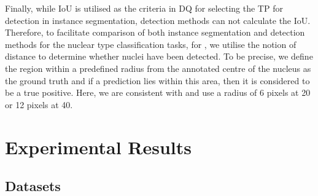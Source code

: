 \documentclass[journal]{IEEEtran}
\begin{document}
    Finally, while IoU is utilised as the criteria in DQ for selecting the TP for detection in instance segmentation, detection methods can not calculate the IoU. Therefore, to facilitate comparison of both instance segmentation and detection methods for the nuclear type classification tasks, for , we utilise the notion of distance to determine whether nuclei have been detected. To be precise, we define the region within a predefined radius from the annotated centre of the nucleus as the ground truth and if a prediction lies within this area, then it is considered to be a true positive. Here, we are consistent with \cite{sirinukunwattana2016locality} and use a radius of 6 pixels at 20 or 12 pixels at 40. 
    
	\section{Experimental Results} \label{section:expandresults}
	\subsection{Datasets} \label{section:datasets}
	


	\begin{table*}[!t]
    	\begin{center}
    		\caption{Summary of the datasets used in our experiments. UHCW denotes University Hospitals Conventry and Warwickshire and TCGA denotes The Cancer Genome Atlas. {\em Seg} denotes segmentation masks and {\em Class} denotes classification labels.}
    		\label{table:dataset_summary}
    		\setlength{\tabcolsep}{9pt} \renewcommand{\arraystretch}{1} 
    	\end{center}
	\end{table*}
\end{document}
